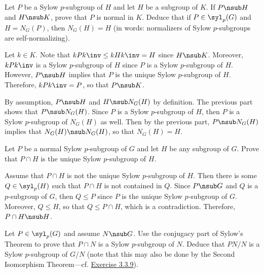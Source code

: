 \begin{exercise}\label{ex4.5.32}
	Let $P$ be a Sylow $p$-subgroup of $H$ and let $H$ be a subgroup of $K$. If $P \nsub H$ and $H \nsub K$, prove that $P$ is normal in $K$. Deduce that if $P \in \syl_p(G)$ and $H = N_G(P)$, then $N_G(H) = H$ (in words: normalizers of Sylow $p$-subgroups are self-normalizing).
\end{exercise}

\begin{sol}
	Let $k \in K$. Note that $kPk\inv \leq kHk\inv = H$ since $H \nsub K$. Moreover, $kPk\inv$ is a Sylow $p$-subgroup of $H$ since $P$ is a Sylow $p$-subgroup of $H$. However, $P \nsub H$ implies that $P$ is the unique Sylow $p$-subgroup of $H$. Therefore, $kPk\inv = P$, so that $P \nsub K$.

	By assumption, $P \nsub H$ and $H \nsub N_G(H)$ by definition. The previous part shows that $P \nsub N_G(H)$. Since $P$ is a Sylow $p$-subgroup of $H$, then $P$ is a Sylow $p$-subgroup of $N_G(H)$ as well. Then by the previous part, $P \nsub N_G(H)$ implies that $N_G(H) \nsub N_G(H)$, so that $N_G(H) = H$.
\end{sol}

\begin{exercise}\label{ex4.5.33}
	Let $P$ be a normal Sylow $p$-subgroup of $G$ and let $H$ be any subgroup of $G$. Prove that $P \cap H$ is the unique Sylow $p$-subgroup of $H$.
\end{exercise}

\begin{sol}
	Assume that $P \cap H$ is not the unique Sylow $p$-subgroup of $H$. Then there is some $Q \in \syl_p(H)$ such that $P \cap H$ is not contained in $Q$. Since $P \nsub G$ and $Q$ is a $p$-subgroup of $G$, then $Q \leq P$ since $P$ is the unique Sylow $p$-subgroup of $G$. Moreover, $Q \leq H$, so that $Q \leq P \cap H$, which is a contradiction. Therefore, $P \cap H \nsub H$.
\end{sol}

\begin{exercise}\label{ex4.5.34}
	Let $P \in \syl_p(G)$ and assume $N \nsub G$. Use the conjugacy part of Sylow's Theorem to prove that $P \cap N$ is a Sylow $p$-subgroup of $N$. Deduce that $PN/N$ is a Sylow $p$-subgroup of $G/N$ (note that this may also be done by the Second Isomorphism Theorem—cf. \hyperref[ex3.3.9]{Exercise 3.3.9}).
\end{exercise}

